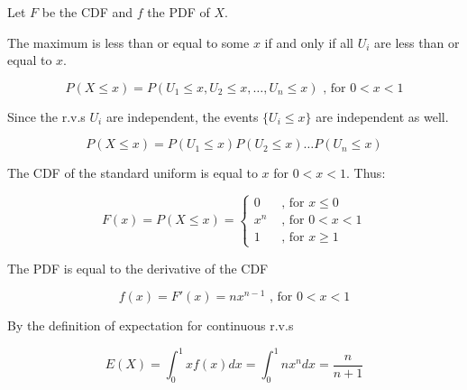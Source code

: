 Let $F$ be the CDF and $f$ the PDF of $X$.

The maximum is less than or equal to some $x$ if and only if all $U_i$ are less than or equal to $x$.

$$
P(X \le x) = P(U_1 \le x, U_2 \le x, \dots, U_n \le x) \text{ , for } 0<x<1
$$

Since the r.v.s $U_i$ are independent, the events $\{ U_i \le x \}$ are independent as well.

$$
P(X \le x) = P(U_1 \le x) P(U_2 \le x) \dots P(U_n \le x)
$$

The CDF of the standard uniform is equal to $x$ for $0<x<1$. Thus:

$$
F(x) = P(X \le x) =
\begin{cases}
0   &\text{ , for } x \le 0 \\
x^n &\text{ , for } 0 < x < 1 \\
1   &\text{ , for } x \ge 1
\end{cases}
$$


The PDF is equal to the derivative of the CDF

$$
f(x) = F'(x) = n x^{n-1} \text{ , for } 0 < x < 1
$$

By the definition of expectation for continuous r.v.s

$$
E(X) = \int_0^1 x f(x) dx = \int_0^1 n x^n dx = \frac{n}{n+1}
$$

